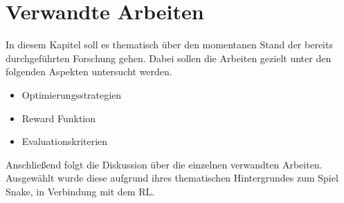 \chapter{Verwandte Arbeiten} \label{chap:Verwandte_Arbeiten}
In diesem Kapitel soll es thematisch über den momentanen Stand der bereits durchgeführten Forschung gehen. Dabei sollen die Arbeiten gezielt unter den folgenden Aspekten untersucht werden. 
\begin{itemize}
	\item Optimierungsstrategien
	\item Reward Funktion
	\item Evaluationskriterien
\end{itemize}
Anschließend folgt die Diskussion über die einzelnen verwandten Arbeiten. 
Ausgewählt wurde diese aufgrund ihres thematischen Hintergrundes zum Spiel Snake, in Verbindung mit dem RL.

